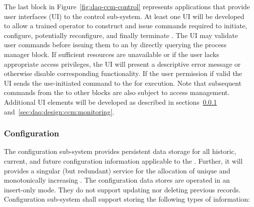 The last block in Figure~\ref{fig:daq-ccm-control} represents applications that provide user interfaces (UI) to the control sub-system.
At least one UI will be developed to allow a trained operator to construct and issue commands required to initiate, configure, potentially reconfigure, and finally terminate . 
The UI may validate user commands before issuing them to an  by directly querying the process manager block. 
If sufficient resources are unavailable or if the user lacks appropriate access privileges, the UI will present a descriptive error message or otherwise disable corresponding functionality.  
If the user permission if valid the UI sends the use-initiated command to the  for execution.
Note that subsequent commands from the  to other blocks are also subject to access management.
Additional UI elements will be developed as described in sections~\ref{sec:daq:design:ccm:configuration} and~\ref{sec:daq:design:ccm:monitoring}.


\subsubsection{Configuration}
\label{sec:daq:design:ccm:configuration}

The  configuration sub-system provides persistent data storage for all historic, current, and future configuration information applicable to the .
Further, it will provides a singular (but redundant) service for the allocation of unique and monotonically increasing .
The configuration data stores are operated in an insert-only mode. 
They do not support updating nor deleting previous records.
Configuration sub-system  shall support storing the following types of information:

